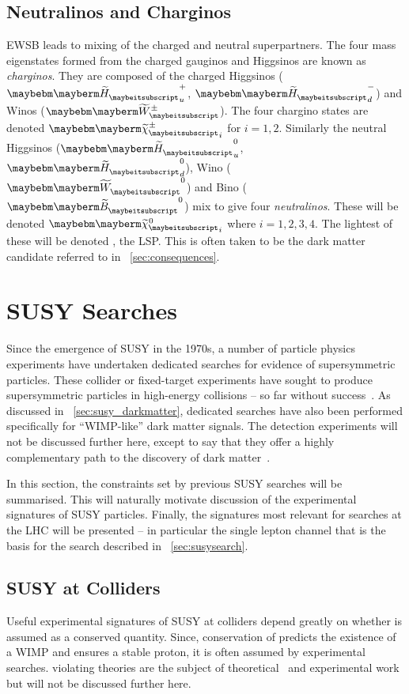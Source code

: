 \subsection{Neutralinos and Charginos}
\ac{EWSB} leads to mixing of the charged and neutral \spinhalf
superpartners. The four mass eigenstates formed from the charged
gauginos and Higgsinos are known as \emph{charginos}. They are
composed of the charged Higgsinos ($\PSHiggs_u^+$, $\PSHiggs_d^-$) and
Winos ($\PSWpm$). The four chargino states are denoted
$\PScharginopm_i$ for $i=1,2$. Similarly the neutral Higgsinos
($\PSHiggs_u^0$, $\PSHiggs_d^0$), Wino ($\PSW^0$) and Bino ($\PSB^0$)
mix to give four \emph{neutralinos}. These will be denoted
$\PSneutralino_i$ where $i=1,2,3,4$. The lightest of these will be
denoted \PSneutralino, the \ac{LSP}. This is often taken to be the
dark matter candidate referred to in \sec~\ref{sec:consequences}.

\section{\acl{SUSY} Searches}
Since the emergence of \ac{SUSY} in the 1970s, a number of particle physics
experiments have undertaken dedicated searches for evidence of supersymmetric
particles. These collider or fixed-target experiments have sought to produce
supersymmetric particles in high-energy collisions -- so far without
success~\cite{ua1_susy,aleph_susy,d0_susy,hera_susy}. As discussed in
\sec~\ref{sec:susy_darkmatter}, dedicated searches have also been performed
specifically for ``\ac{WIMP}-like'' dark matter signals. The detection
experiments will not be discussed further here, except to say that they offer a
highly complementary path to the discovery of dark
matter~\cite{mastercode_2011}.

In this section, the constraints set by previous \ac{SUSY} searches will be
summarised. This will naturally motivate discussion of the experimental
signatures of \ac{SUSY} particles. Finally, the signatures most relevant for
searches at the \ac{LHC} will be presented -- in particular the single lepton
channel that is the basis for the search described in
\chap~\ref{sec:susysearch}.

\subsection{\acl{SUSY} at Colliders}
Useful experimental signatures of \ac{SUSY} at colliders depend greatly on
whether \Rparity is assumed as a conserved quantity. Since, conservation of
\Rparity predicts the existence of a \ac{WIMP} and ensures a stable proton, it
is often assumed by experimental searches. \Rparity violating theories are the
subject of theoretical~\cite{aulakh_rpv} and experimental work but will not be
discussed further here.

